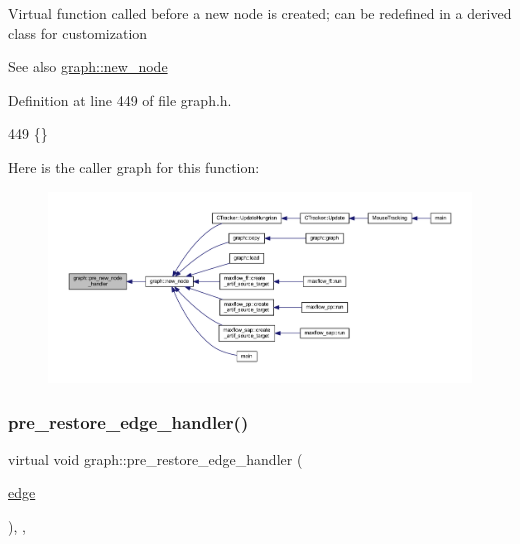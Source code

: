 Virtual function called before a new node is created; can be redefined in a derived class for customization

\begin{DoxySeeAlso}{See also}
\mbox{\hyperlink{classgraph_ab9505335c20558319b6cce25aed23524}{graph\+::new\+\_\+node}} 
\end{DoxySeeAlso}


Definition at line 449 of file graph.\+h.


\begin{DoxyCode}
449 \{\}
\end{DoxyCode}
Here is the caller graph for this function\+:
\nopagebreak
\begin{figure}[H]
\begin{center}
\leavevmode
\includegraphics[width=350pt]{classgraph_afb7606eaa8d673b6599af24437c0546c_icgraph}
\end{center}
\end{figure}
\mbox{\label{classgraph_a569d227d9f4914278a143d52139e3303}} 
\subsubsection{\texorpdfstring{pre\+\_\+restore\+\_\+edge\+\_\+handler()}{pre\_restore\_edge\_handler()}}
{\footnotesize\ttfamily virtual void graph\+::pre\+\_\+restore\+\_\+edge\+\_\+handler (\begin{DoxyParamCaption}\item[{\mbox{\hyperlink{classedge}{edge}}}]{ }\end{DoxyParamCaption})\hspace{0.3cm}{\ttfamily [inline]}, {\ttfamily [virtual]}, {\ttfamily [inherited]}}

